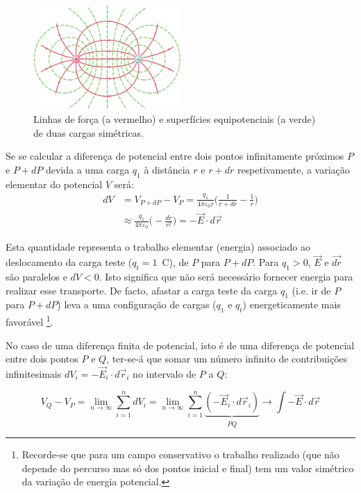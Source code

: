\documentclass[a4paper,twoside,11pt]{report}      %
\begin{document}
\begin{figure}[tb]
  \centering 
	\includegraphics[width=0.5\textwidth]{./fig2-thomson} 
	\caption{ Linhas de força (a vermelho) e superfícies equipotenciais (a verde) de duas cargas simétricas. \label{fig:sup-equip}} 
\end{figure}

Se se calcular a diferença de potencial entre dois pontos infinitamente próximos $P$ e $P+dP$ devida a uma carga $q_1$ à distância $r$ e $r+dr$ respetivamente, a variação elementar do potencial $V$ será:
\begin{align}
d V &= V_{P+dP} - V_P = \frac{q_1}{4 \pi \varepsilon_0 r} \big(  \frac{1}{r + dr} -\frac{1}{r} \big)\nonumber\\
	 &\approx \frac{q_1}{4 \pi \varepsilon_0 } \big(  - \frac{dr}{r^2} \big) = - \vec{E} \cdot d \vec{r}  \end{align}

Esta quantidade representa o trabalho elementar (energia) associado ao deslocamento da
carga teste ($q_t=1\,$ C), de $P$ para $P+dP$. Para $q_1 > 0$,	$\vec{E}$ e $\vec{dr}$ são paralelos e $dV < 0$. Isto significa que
não será necessário fornecer energia para realizar esse transporte. 
De facto, afastar a carga teste da carga $q_1$ (i.e. ir de $P$ para $P+dP$) leva a uma configuração de cargas ($q_1$ e $q_t$) energeticamente mais favorável \footnote{Recorde-se que para um campo conservativo o trabalho realizado (que não depende do percurso mas só dos pontos inicial e final) tem um valor simétrico da variação de energia potencial.}.

No caso de uma diferença finita de potencial, isto é de uma diferença de potencial entre dois pontos $P$ e $Q$, ter-se-á que somar um número infinito de contribuições infinitesimais $dV_i=- \vec{E}_i \cdot d\vec{r}_i$ no intervalo de $P$ a $Q$:

\begin{equation}
V_Q-V_P  = \lim_{n  \to \infty } \sum_{i=1}^n dV_i = \lim_{n \to \infty } \sum_{i=1}^n \underbrace{( - \vec{E}_i \cdot d\vec{r}_i )}_{\overline{PQ}} \rightarrow \int - \vec{E} \cdot d\vec{r}
\end{equation}
\end{document}
